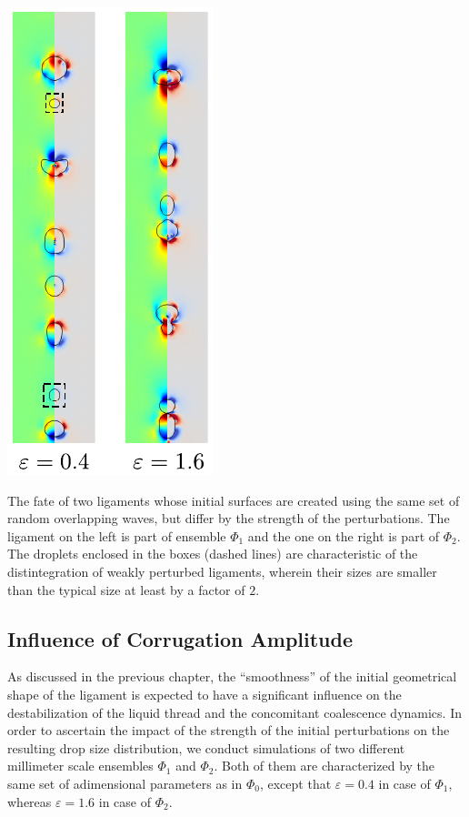 


\begin{marginfigure}[2cm]
\centering
\includegraphics{plots/drop_stats/amp_long_compare.pdf}
	\caption{The fate of two ligaments whose initial surfaces 
	are created using the same set of random overlapping waves, 
	but differ by the strength of the perturbations.
	The ligament on the left is part of ensemble $\Phi_1$ 
	and the one on the right is part of $\Phi_2$. 
	The droplets enclosed in the boxes (dashed lines)
	are characteristic of the distintegration of weakly perturbed ligaments,
	wherein their sizes are smaller than the typical size at least by a factor of $2$. 
	}
\label{amp_long_comp}
\end{marginfigure}


\subsection*{Influence of Corrugation Amplitude}
As discussed in the previous chapter, the ``smoothness'' of the initial geometrical
shape of the ligament is expected to have a significant influence on the 
destabilization of the liquid thread and the concomitant coalescence dynamics.
In order to ascertain the impact of the strength of the initial perturbations
on the resulting drop size distribution, we conduct simulations of two different 
millimeter scale ensembles $\Phi_1$ and $\Phi_2$. Both of them are characterized 
by the same set of adimensional parameters as in $\Phi_0$, except that $\varepsilon = 0.4$
in case of $\Phi_1$, whereas $\varepsilon = 1.6$ in case of $\Phi_2$.


